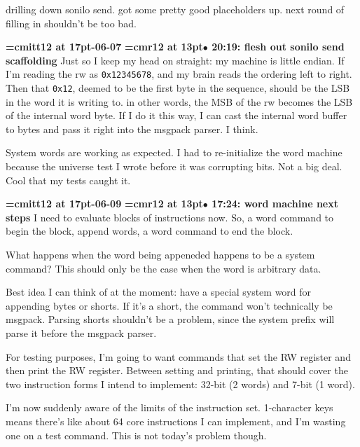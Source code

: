 drilling down sonilo send. got some pretty good placeholders up. next round of filling in shouldn't be too bad.
\par

{\medskip\noindent\bf\font\titlefont=cmitt12 at 17pt-06-07}\medskip
{\smallskip\noindent\bf\font\titlefont=cmr12 at 13pt\titlefont $\bullet$ 20:19: flesh out sonilo send scaffolding}\smallskip
Just so I keep my head on straight: my machine is little endian. If I'm reading the rw as {\tt 0x12345678}, and my brain reads the ordering left to right. Then that {\tt 0x12}, deemed to be the first byte in the sequence, should be the LSB in the word it is writing to. in other words, the MSB of the rw becomes the LSB of the internal word byte. If I do it this way, I can cast the internal word buffer to bytes and pass it right into the msgpack parser. I think.
\par

System words are working as expected. I had to re-initialize the word machine because the universe test I wrote before it was corrupting bits. Not a big deal. Cool that my tests caught it.
\par

{\medskip\noindent\bf\font\titlefont=cmitt12 at 17pt-06-09}\medskip
{\smallskip\noindent\bf\font\titlefont=cmr12 at 13pt\titlefont $\bullet$ 17:24: word machine next steps}\smallskip
I need to evaluate blocks of instructions now. So, a word command to begin the block, append words, a word command to end the block.
\par

What happens when the word being appeneded happens to be a system command? This should only be the case when the word is arbitrary data.
\par

Best idea I can think of at the moment: have a special system word for appending bytes or shorts. If it's a short, the command won't technically be msgpack. Parsing shorts shouldn't be a problem, since the system prefix will parse it before the msgpack parser.
\par

For testing purposes, I'm going to want commands that set the RW register and then print the RW register. Between setting and printing, that should cover the two instruction forms I intend to implement: 32-bit (2 words) and 7-bit (1 word).
\par

I'm now suddenly aware of the limits of the instruction set. 1-character keys means there's like about 64 core instructions I can implement, and I'm wasting one on a test command. This is not today's problem though.
\par

